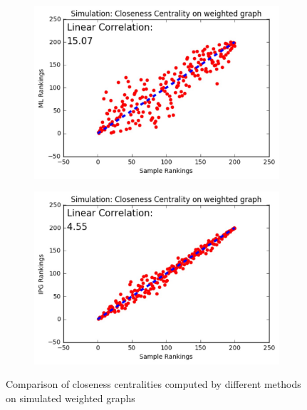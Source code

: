 \documentclass[9pt]{beamer}
\begin{document}
\begin{frame}
\begin{figure}[H]
\begin{subfigure}{.32\textwidth}
    \includegraphics[width=0.95\linewidth]{CCW_ML.jpeg}
\end{subfigure}
\begin{subfigure}{.32\textwidth}
	\centering
    \includegraphics[width=0.95\linewidth]{CCW_IPG.jpeg}
\end{subfigure}
\caption{Comparison of closeness centralities computed by different methods on simulated weighted graphs}
\end{figure}
\end{frame}
\end{document}
